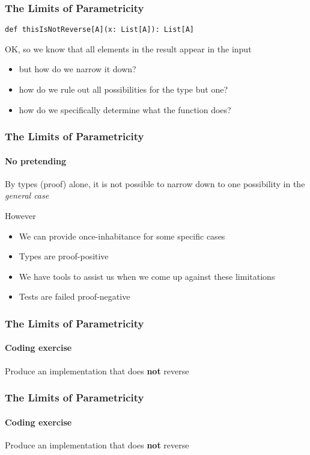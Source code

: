 \begin{frame}[fragile]
\frametitle{The Limits of Parametricity}
\begin{lstlisting}[style=scala]
def thisIsNotReverse[A](x: List[A]): List[A]
\end{lstlisting}
OK, so we know that all elements in the result appear in the input
\begin{itemize}
 \item but how do we narrow it down?
 \item how do we rule out all possibilities for the type but one?
 \item how do we specifically determine what the function does?
\end{itemize}
\end{frame}

\begin{frame}[fragile]
\frametitle{The Limits of Parametricity}
\framesubtitle{No pretending}
By types (proof) alone, it is not possible to narrow down to one possibility in
the \emph{general case}
\begin{block}{However}
\begin{itemize}
  \item We can provide once-inhabitance for some specific cases
  \item Types are proof-positive
  \item We have tools to assist us when we come up against these limitations
  \item Tests are failed proof-negative
\end{itemize}
\end{block}
\end{frame}

\begin{frame}[fragile]
\frametitle{The Limits of Parametricity}
\framesubtitle{Coding exercise}
\begin{block}{Produce an implementation that does \textbf{not} reverse}

\end{block}
\end{frame}

\begin{frame}[fragile]
\frametitle{The Limits of Parametricity}
\framesubtitle{Coding exercise}
\begin{block}{Produce an implementation that does \textbf{not} reverse}

\end{block}
\end{frame}

